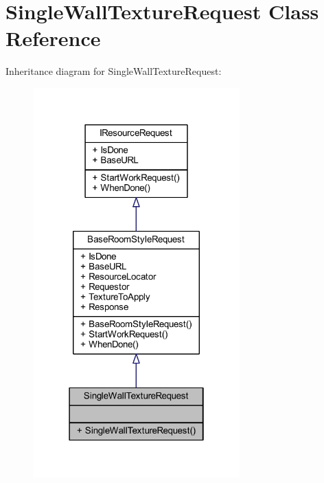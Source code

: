 \hypertarget{class_single_wall_texture_request}{}\section{Single\+Wall\+Texture\+Request Class Reference}
\label{class_single_wall_texture_request}


Inheritance diagram for Single\+Wall\+Texture\+Request\+:
\nopagebreak
\begin{figure}[H]
\begin{center}
\leavevmode
\includegraphics[width=226pt]{class_single_wall_texture_request__inherit__graph}
\end{center}
\end{figure}



